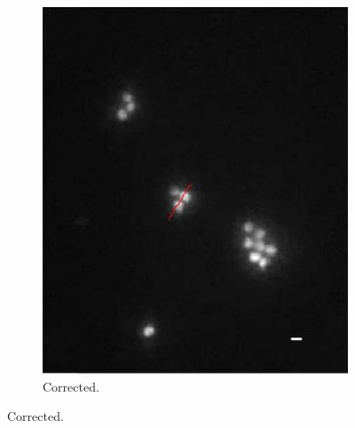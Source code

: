 \begin{figure}[htb]
\begin{subfigure}[b]{0.25\textwidth}
                \includegraphics[width=\textwidth]{images/wide_direct_b}
                \caption{Corrected.}
                \label{fig:wide_direct_b}
        \end{subfigure}
				

\end{figure}
